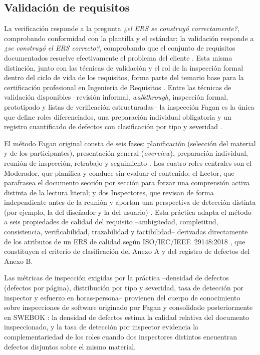 \documentclass[11pt,a4paper]{article}
\begin{document}
\subsection{Validación de requisitos}
La verificación responde a la pregunta \textit{¿el ERS se construyó correctamente?}, comprobando conformidad con la plantilla y el estándar; la validación responde a \textit{¿se construyó el ERS correcto?}, comprobando que el conjunto de requisitos documentados resuelve efectivamente el problema del cliente \cite{iso29148,pohl2010}. Esta misma distinción, junto con las técnicas de validación y el rol de la inspección formal dentro del ciclo de vida de los requisitos, forma parte del temario base para la certificación profesional en Ingeniería de Requisitos \cite{ireb2022}. Entre las técnicas de validación disponibles --revisión informal, \textit{walkthrough}, inspección formal, prototipado y listas de verificación estructuradas-- la inspección Fagan es la única que define roles diferenciados, una preparación individual obligatoria y un registro cuantificado de defectos con clasificación por tipo y severidad \cite{fagan1976inspections}.

El método Fagan original consta de seis fases: planificación (selección del material y de los participantes), presentación general (\textit{overview}), preparación individual, reunión de inspección, retrabajo y seguimiento \cite{fagan1976inspections}. Los cuatro roles centrales son el Moderador, que planifica y conduce sin evaluar el contenido; el Lector, que parafrasea el documento sección por sección para forzar una comprensión activa distinta de la lectura literal; y dos Inspectores, que revisan de forma independiente antes de la reunión y aportan una perspectiva de detección distinta (por ejemplo, la del diseñador y la del usuario) \cite{fagan1976inspections}. Esta práctica adapta el método a seis propiedades de calidad del requisito --ambigüedad, completitud, consistencia, verificabilidad, trazabilidad y factibilidad-- derivadas directamente de los atributos de un ERS de calidad según ISO/IEC/IEEE~29148:2018 \cite{iso29148}, que constituyen el criterio de clasificación del Anexo A y del registro de defectos del Anexo B.

Las métricas de inspección exigidas por la práctica --densidad de defectos (defectos por página), distribución por tipo y severidad, tasa de detección por inspector y esfuerzo en horas-persona-- provienen del cuerpo de conocimiento sobre inspecciones de software originado por Fagan y consolidado posteriormente en SWEBOK \cite{fagan1976inspections,swebok2024}: la densidad de defectos estima la calidad relativa del documento inspeccionado, y la tasa de detección por inspector evidencia la complementariedad de los roles cuando dos inspectores distintos encuentran defectos disjuntos sobre el mismo material.
\end{document}
